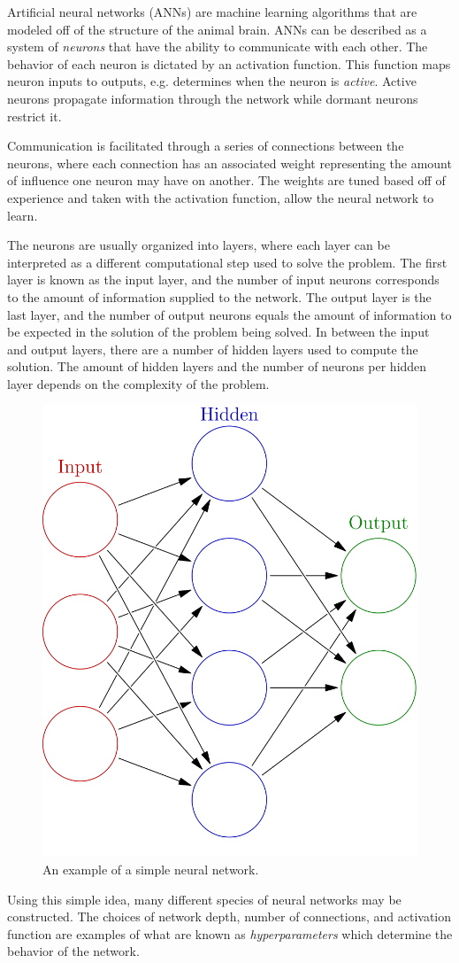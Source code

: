 \documentclass[twoside]{article}
\begin{document}
\begin{multicols}{2}
Artificial neural networks (ANNs) are machine learning algorithms that are modeled off of the structure of the animal brain. ANNs can be described as a system of \textit{neurons} that have the ability to communicate with each other. The behavior of each neuron is dictated by an activation function. This function maps neuron inputs to outputs, e.g. determines when the neuron is \textit{active}. Active neurons propagate information through the network while dormant neurons restrict it.  \par Communication is facilitated through a series of connections between the neurons, where each connection has an associated weight representing the amount of influence one neuron may have on another. The weights are tuned based off of experience and taken with the activation function, allow the neural network to learn. \par The neurons are usually organized into layers, where each layer can be interpreted as a different computational step used to solve the problem. The first layer is known as the input layer, and the number of input neurons corresponds to the amount of information supplied to the network. The output layer is the last layer, and the number of output neurons equals the amount of information to be expected in the solution of the problem being solved. In between the input and output layers, there are a number of hidden layers used to compute the solution. The amount of hidden layers and the number of neurons per hidden layer depends on the complexity of the problem.
\begin{figure}[H]
	\centering
	\includegraphics[width=0.5\linewidth]{images/neural}
	\caption{An example of a simple neural network.}
	\label{ip}
\end{figure}
Using this simple idea, many different species of neural networks may be constructed. The choices of network depth, number of connections, and activation function are examples of what are known as \textit{hyperparameters} which determine the behavior of the network.


\end{multicols}
\end{document}
